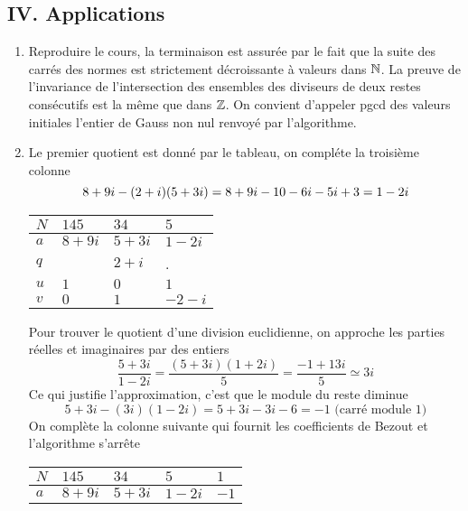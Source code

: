 \subsection*{IV. Applications}
\begin{enumerate}
  \item Reproduire le cours, la terminaison est assurée par le fait que la suite des carrés des normes est strictement décroissante à valeurs dans $\mathbb{N}$. La preuve de l'invariance de l'intersection des ensembles des diviseurs de deux restes consécutifs est la même que dans $\mathbb{Z}$. On convient d'appeler pgcd des valeurs initiales l'entier de Gauss non nul renvoyé par l'algorithme.
  
  \item Le premier quotient est donné par le tableau, on compléte la troisième colonne
\begin{displaymath}
  8+9i - (2+i)(5+3i) = 8+9i -10 -6i -5i +3 = 1 - 2i \\
\end{displaymath}
  \begin{center}
\begin{tabular}{|l|l|l|l|} \hline
$N$ & $145$  & $34$  & $5$    \\ \hline
$a$ & $8+9i$ & $5+3i$& $1-2i$ \\ \hline
$q$ &        & $2+i$ & .      \\ \hline
$u$ & $1$    & $0$   & $1$    \\ \hline
$v$ & $0$    & $1$   & $-2-i$ \\ \hline
  \end{tabular}
  \end{center}
Pour trouver le quotient d'une division euclidienne, on approche les parties réelles et imaginaires par des entiers
\begin{displaymath}
  \frac{5+3i}{1-2i}=\frac{(5+3i)(1+2i)}{5} = \frac{-1+13i}{5} \simeq 3i
\end{displaymath}
Ce qui justifie l'approximation, c'est que le module du reste diminue
\begin{displaymath}
  5+3i-(3i)(1-2i) = 5+3i -3i -6 = -1 \text{ (carré module $1$)} 
\end{displaymath}
On complète la colonne suivante qui fournit les coefficients de Bezout et l'algorithme s'arrête
  \begin{center}
\begin{tabular}{|l|l|l|l|l|} \hline
$N$ & $145$  & $34$  & $5$    & $1$    \\ \hline
$a$ & $8+9i$ & $5+3i$& $1-2i$ & $-1$  \\ \hline

\end{tabular}
\end{center}
\end{enumerate}

